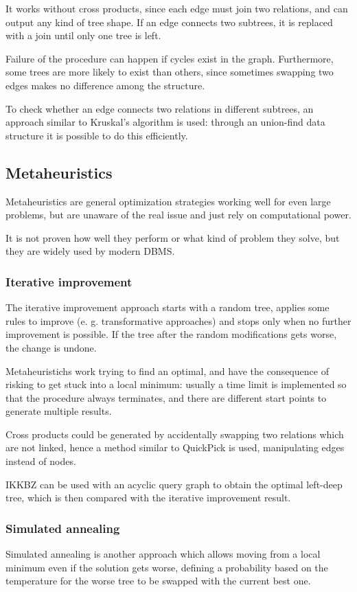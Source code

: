 It works without cross products, since each edge must join two relations, and can output any kind of tree shape. If an edge connects two subtrees, it is replaced with a join until only one tree is left. 

Failure of the procedure can happen if cycles exist in the graph. Furthermore, some trees are more likely to exist than others, since sometimes swapping two edges makes no difference among the structure.

To check whether an edge connects two relations in different subtrees, an approach similar to Kruskal's algorithm is used: through an union-find data structure it is possible to do this efficiently.

\subsection{Metaheuristics}
Metaheuristics are general optimization strategies working well for even large problems, but are unaware of the real issue and just rely on computational power.

It is not proven how well they perform or what kind of problem they solve, but they are widely used by modern DBMS.

\subsubsection{Iterative improvement}
The iterative improvement approach starts with a random tree, applies some rules to improve (e. g. transformative approaches) and stops only when no further improvement is possible. If the tree after the random modifications gets worse, the change is undone. 

Metaheuristichs work trying to find an optimal, and have the consequence of risking to get stuck into a local minimum: usually a time limit is implemented so that the procedure always terminates, and there are different start points to generate multiple results.

Cross products could be generated by accidentally swapping two relations which are not linked, hence a method similar to QuickPick is used, manipulating edges instead of nodes.

IKKBZ can be used with an acyclic query graph to obtain the optimal left-deep tree, which is then compared with the iterative improvement result.

\subsubsection{Simulated annealing}
Simulated annealing is another approach which allows moving from a local minimum even if the solution gets worse, defining a probability based on the temperature for the worse tree to be swapped with the current best one. 

